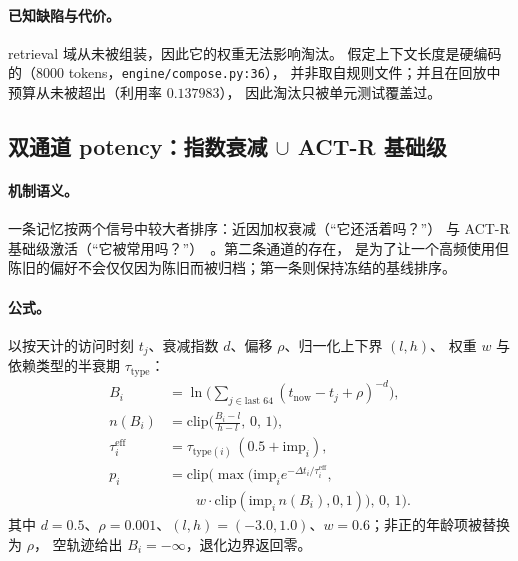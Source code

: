 \paragraph{已知缺陷与代价。} retrieval 域从未被组装，因此它的权重无法影响淘汰。
假定上下文长度是硬编码的（8000 tokens，\texttt{engine/\allowbreak{}compose.\allowbreak{}py:\allowbreak{}36}），
并非取自规则文件；并且在回放中预算从未被超出（利用率 $0.137983$），
因此淘汰只被单元测试覆盖过。

\subsection{双通道 potency：指数衰减 $\cup$ ACT-R 基础级}

\paragraph{机制语义。} 一条记忆按两个信号中较大者排序：近因加权衰减（“它还活着吗？”）
与 ACT-R 基础级激活（“它被常用吗？”）~\cite{anderson1991}。第二条通道的存在，
是为了让一个高频使用但陈旧的偏好不会仅仅因为陈旧而被归档；第一条则保持冻结的基线排序。

\paragraph{公式。} 以按天计的访问时刻 $t_j$、衰减指数 $d$、偏移 $\rho$、归一化上下界 $(l,h)$、
权重 $w$ 与依赖类型的半衰期 $\tau_{\mathrm{type}}$：
{\small
\begin{equation}
\begin{aligned}
B_i &= \ln\!\Big(\sum_{j \in \text{last }64} (t_{\mathrm{now}} - t_j + \rho)^{-d}\Big),\\
n(B_i) &= \mathrm{clip}\!\Big(\frac{B_i - l}{h - l},\,0,\,1\Big),\\
\tau_i^{\mathrm{eff}} &= \tau_{\mathrm{type}(i)}\,(0.5 + \mathrm{imp}_i),\\
p_i &= \mathrm{clip}\Big(\max\big(\mathrm{imp}_i e^{-\Delta t_i/\tau_i^{\mathrm{eff}}},\\
&\qquad w \cdot \mathrm{clip}(\mathrm{imp}_i\, n(B_i),0,1)\big),\,0,\,1\Big).
\end{aligned}
\end{equation}
}
其中 $d=0.5$、$\rho=0.001$、$(l,h)=(-3.0,1.0)$、$w=0.6$；非正的年龄项被替换为 $\rho$，
空轨迹给出 $B_i=-\infty$，退化边界返回零。

